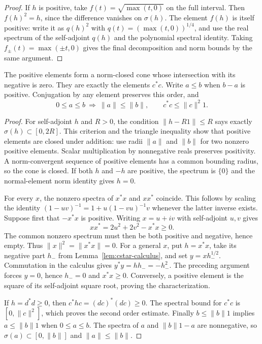 \begin{proof}
If $h$ is positive, take $f(t)=\sqrt{\max(t,0)}$ on the full interval.
Then $f(h)^2=h$, since the difference vanishes on $\sigma(h)$.
The element $f(h)$ is itself positive: write it as $q(h)^2$ with
$q(t)=(\max(t,0))^{1/4}$, and use the real spectrum of the self-adjoint
$q(h)$ and the polynomial spectral identity.
Taking $f_\pm(t)=\max(\pm t,0)$ gives the final decomposition and norm
bounds by the same argument.
\end{proof}

\begin{lemma}
\label{lem:cstar-order}
The positive elements form a norm-closed cone whose intersection with its
negative is zero.  They are exactly the elements $c^*c$.
Write $a\leq b$ when $b-a$ is positive.  Conjugation by any element preserves
this order, and
\[
 0\leq a\leq b\ \Longrightarrow\ \|a\|\leq\|b\|,
 \qquad c^*c\leq\|c\|^2 1.
\]
\end{lemma}

\begin{proof}
For self-adjoint $h$ and $R>0$, the condition
$\|h-R1\|\leq R$ says exactly $\sigma(h)\subset[0,2R]$.
This criterion and the triangle inequality show that positive elements
are closed under addition: use radii $\|a\|$ and $\|b\|$ for two nonzero
positive elements.  Scalar multiplication by nonnegative reals preserves
positivity.  A norm-convergent sequence of positive elements has a common
bounding radius, so the cone is closed.  If both $h$ and $-h$ are positive,
the spectrum is $\{0\}$ and the normal-element norm identity gives $h=0$.

For every $x$, the nonzero spectra of $x^*x$ and $xx^*$ coincide.
This follows by scaling the identity
$(1-uv)^{-1}=1+u(1-vu)^{-1}v$ whenever the latter inverse exists.
Suppose first that $-x^*x$ is positive.  Writing $x=u+iv$ with self-adjoint
$u,v$ gives
\[
 xx^*=2u^2+2v^2-x^*x\geq0.
\]
The common nonzero spectrum must then be both positive and negative, hence
empty.  Thus $\|x\|^2=\|x^*x\|=0$.
For a general $x$, put $h=x^*x$, take its negative part $h_-$ from
Lemma~\ref{lem:cstar-calculus}, and set $y=xh_-^{1/2}$.
Commutation in the calculus gives $y^*y=hh_-=-h_-^2$.
The preceding argument forces $y=0$, hence $h_-=0$ and $x^*x\geq0$.
Conversely, a positive element is the square of its self-adjoint square
root, proving the characterization.

If $h=d^*d\geq0$, then $c^*hc=(dc)^*(dc)\geq0$.
The spectral bound for $c^*c$ is $[0,\|c\|^2]$, which proves the second
order estimate.  Finally $b\leq\|b\|1$ implies
$a\leq\|b\|1$ when $0\leq a\leq b$.
The spectra of $a$ and $\|b\|1-a$ are nonnegative, so
$\sigma(a)\subset[0,\|b\|]$ and $\|a\|\leq\|b\|$.
\end{proof}

